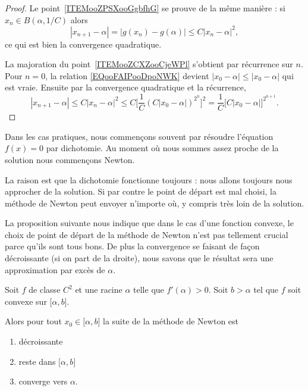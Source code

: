 \begin{proof}
	Le point~\ref{ITEMooZPSXooGgbfhG} se prouve de la même manière : si \( x_n\in B(\alpha,1/C)\) alors
	\begin{equation}
		| x_{n+1}-\alpha |=| g(x_n)-g(\alpha) |\leq C| x_n-\alpha |^2,
	\end{equation}
	ce qui est bien la convergence quadratique.

	La majoration du point~\ref{ITEMooZCXZooCjeWPl} s'obtient par récurrence sur \( n\). Pour \( n=0\), la relation \eqref{EQooFAIPooDpoNWK} devient \( | x_0-\alpha |\leq | x_0-\alpha |\) qui est vraie. Ensuite par la convergence quadratique et la récurrence,
	\begin{equation}
		| x_{n+1}-\alpha |\leq C| x_n-\alpha |^2\leq C\big[  \frac{1}{ C }(C| x_0-\alpha |)^{2^n}  \big]^2=\frac{1}{ C }\big[ C| x_0-\alpha | \big]^{2^{n+1}}.
	\end{equation}
\end{proof}

\begin{normaltext}
	Dans les cas pratiques, nous commençons souvent par résoudre l'équation \( f(x)=0\) par dichotomie. Au moment où nous sommes assez proche de la solution nous commençons Newton.

	La raison est que la dichotomie fonctionne toujours : nous allons toujours nous approcher de la solution. Si par contre le point de départ est mal choisi, la méthode de Newton peut envoyer n'importe où, y compris très loin de la solution.
\end{normaltext}

La proposition suivante nous indique que dans le cas d'une fonction convexe, le choix de point de départ de la méthode de Newton n'est pas tellement crucial parce qu'ils sont tous bons. De plus la convergence se faisant de façon décroissante (si on part de la droite), nous savons que le résultat sera une approximation par excès de \( \alpha\).
\begin{proposition}     \label{PROPooVTSAooAtSLeI}
	Soit \( f\) de classe \( C^2\) et une racine \( \alpha\) telle que \( f'(\alpha)>0\). Soit \( b>\alpha \) tel que \( f\) soit convexe sur \( \mathopen[ \alpha , b \mathclose]\).

	Alors pour tout \( x_0\in\mathopen[ \alpha , b \mathclose]\) la suite de la méthode de Newton est
	\begin{enumerate}
		\item
		      décroissante
		\item
		      reste dans \( \mathopen[ \alpha , b \mathclose]\)
		\item
		      converge vers \( \alpha\).
	\end{enumerate}
\end{proposition}

